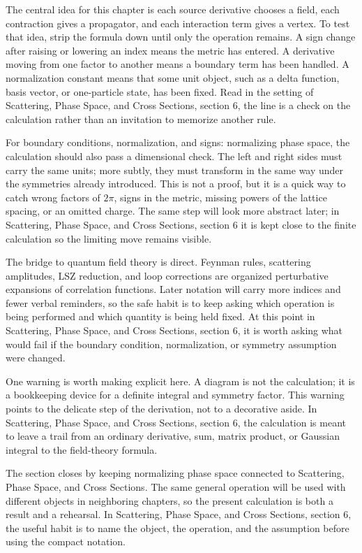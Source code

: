 The central idea for this chapter is each source derivative chooses a field, each contraction gives a propagator, and each interaction term gives a vertex.  To test that idea, strip the formula down until only the operation remains.  A sign change after raising or lowering an index means the metric has entered.  A derivative moving from one factor to another means a boundary term has been handled.  A normalization constant means that some unit object, such as a delta function, basis vector, or one-particle state, has been fixed.  Read in the setting of Scattering, Phase Space, and Cross Sections, section 6, the line is a check on the calculation rather than an invitation to memorize another rule.

For boundary conditions, normalization, and signs: normalizing phase space, the calculation should also pass a dimensional check.  The left and right sides must carry the same units; more subtly, they must transform in the same way under the symmetries already introduced.  This is not a proof, but it is a quick way to catch wrong factors of \(2\pi\), signs in the metric, missing powers of the lattice spacing, or an omitted charge.  The same step will look more abstract later; in Scattering, Phase Space, and Cross Sections, section 6 it is kept close to the finite calculation so the limiting move remains visible.

The bridge to quantum field theory is direct.  Feynman rules, scattering amplitudes, LSZ reduction, and loop corrections are organized perturbative expansions of correlation functions.  Later notation will carry more indices and fewer verbal reminders, so the safe habit is to keep asking which operation is being performed and which quantity is being held fixed.  At this point in Scattering, Phase Space, and Cross Sections, section 6, it is worth asking what would fail if the boundary condition, normalization, or symmetry assumption were changed.

One warning is worth making explicit here.  A diagram is not the calculation; it is a bookkeeping device for a definite integral and symmetry factor.  This warning points to the delicate step of the derivation, not to a decorative aside.  In Scattering, Phase Space, and Cross Sections, section 6, the calculation is meant to leave a trail from an ordinary derivative, sum, matrix product, or Gaussian integral to the field-theory formula.

The section closes by keeping normalizing phase space connected to Scattering, Phase Space, and Cross Sections.  The same general operation will be used with different objects in neighboring chapters, so the present calculation is both a result and a rehearsal.  In Scattering, Phase Space, and Cross Sections, section 6, the useful habit is to name the object, the operation, and the assumption before using the compact notation.



